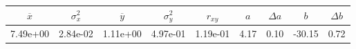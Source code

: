 \begin{tabular}{ccccccccc}
\toprule
$\overline{x}$ & $\sigma_x^2$ & $\overline{y}$ & $\sigma_y^2$ & $r_{xy}$ & $a$ & $\Delta a$ & $b$ & $\Delta b$ \\
\midrule
7.49e+00 & 2.84e-02 & 1.11e+00 & 4.97e-01 & 1.19e-01 & 4.17 & 0.10 & -30.15 & 0.72 \\
\bottomrule
\end{tabular}
